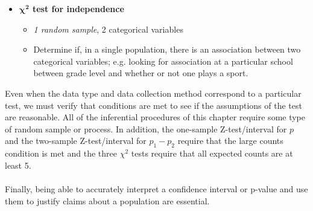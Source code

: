 \begin{itemize}
\item \textbf{$\pmb{\chi^2}$ test for independence}
\begin{itemize}\vspace{-2mm}
\setlength{\itemsep}{0mm}
\item \emph{1 random sample}, 2 categorical variables
\item Determine if, in a single population, there is an association between two categorical variables; e.g. looking for association at a particular school between grade level and whether or not one plays a sport.
\end{itemize}

\end{itemize}
Even when the data type and data collection method correspond to a particular test, we must verify that conditions are met to see if the assumptions of the test are reasonable.  All of the inferential procedures of this chapter require some type of random sample or process.  In addition, the one-sample Z-test/interval for $p$ and the two-sample Z-test/interval for $p_1 - p_2$ require that the large counts condition is met and the three $\chi^2$ tests require that all expected counts are at least 5.
\\
\\
Finally, being able to accurately interpret a confidence interval or p-value and use them to justify claims about a population are essential. 